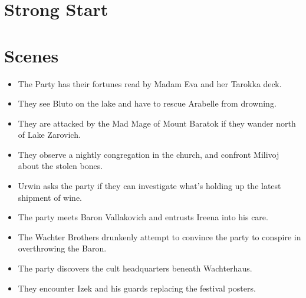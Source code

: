 \documentclass[a4paper,11pt]{article}
\begin{document}
\pagebreak
\section{Strong Start}
\label{sec:StrongStart}


\section{Scenes}
\label{sec:Scenes}
\begin{itemize}
  \item The Party has their fortunes read by Madam Eva and her Tarokka deck.
  \item They see Bluto on the lake and have to rescue Arabelle from drowning.
  \item They are attacked by the Mad Mage of Mount Baratok if they wander north of Lake Zarovich.
  \item They observe a nightly congregation in the church, and confront Milivoj about the stolen bones.
  \item Urwin asks the party if they can investigate what's holding up the latest shipment of wine.
  \item The party meets Baron Vallakovich and entrusts Ireena into his care.
  \item The Wachter Brothers drunkenly attempt to convince the party to conspire in overthrowing the Baron.
  \item The party discovers the cult headquarters beneath Wachterhaus.
  \item They encounter Izek and his guards replacing the festival posters.
\end{itemize}
\end{document}
